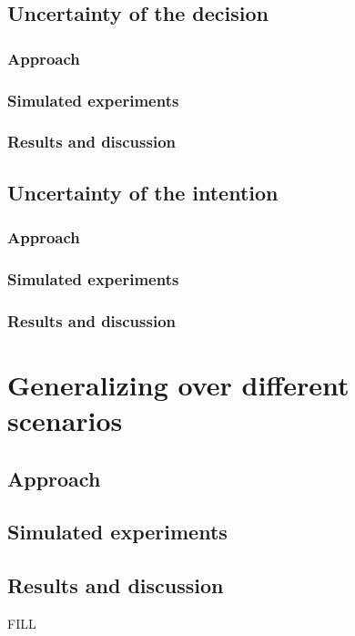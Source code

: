 \section{Uncertainty of the decision}
\subsection{Approach}
\subsection{Simulated experiments}
\subsection{Results and discussion}

\section{Uncertainty of the intention}
\subsection{Approach}
\subsection{Simulated experiments}
\subsection{Results and discussion}


\chapter{Generalizing over different scenarios}
\section{Approach}
\section{Simulated experiments}
\section{Results and discussion}
FILL